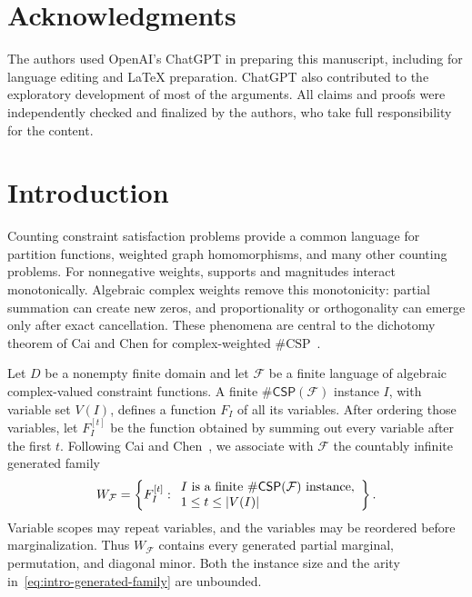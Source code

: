 \documentclass[11pt]{article}
\theoremstyle{plain}
\theoremstyle{definition}
\theoremstyle{remark}
\newcommand{\cF}{\mathcal F}
\newcommand{\CSP}[1]{\mathsf{\#CSP}(#1)}
\DeclarePairedDelimiter{\abs}{\lvert}{\rvert}
\begin{document}
\section*{Acknowledgments}
The authors used OpenAI's ChatGPT in preparing
this manuscript, including for language editing and \LaTeX{} preparation.
ChatGPT also contributed to the exploratory development of most of the
arguments. All claims and proofs were independently checked and finalized
by the authors, who take full responsibility for the content.

\section{Introduction}
\label{sec:introduction}

Counting constraint satisfaction problems provide a common language for
partition functions, weighted graph homomorphisms, and many other counting
problems.  For nonnegative weights, supports and magnitudes interact
monotonically.  Algebraic complex weights remove this monotonicity: partial
summation can create new zeros, and proportionality or orthogonality can
emerge only after exact cancellation.  These phenomena are central to the
dichotomy theorem of Cai and Chen for complex-weighted
$\#\mathrm{CSP}$~\cite{CaiChen2017}.

Let $D$ be a nonempty finite domain and let $\cF$ be a finite language of
algebraic complex-valued constraint functions.  A finite $\CSP{\cF}$
instance $I$, with variable set $V(I)$, defines a function $F_I$ of all its
variables.  After ordering those variables, let $F_I^{[t]}$ be the function
obtained by summing out every variable after the first $t$.  Following Cai and
Chen~\cite[Section~3]{CaiChen2017}, we associate with $\cF$ the countably
infinite generated family
\begin{equation}
  W_{\cF}
  =\left\{F_I^{[t]}:
    \begin{array}{l}
      I\text{ is a finite }\CSP{\cF}\text{ instance},\\
      1\le t\le \abs{V(I)}
    \end{array}
    \right\}.
  \label{eq:intro-generated-family}
\end{equation}
Variable scopes may repeat variables, and the variables may be reordered
before marginalization.  Thus $W_{\cF}$ contains every generated partial
marginal, permutation, and diagonal minor.  Both the instance size and the
arity in~\eqref{eq:intro-generated-family} are unbounded.
\end{document}
